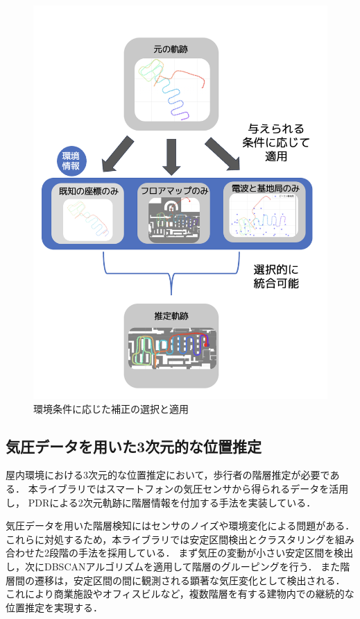 \documentclass[a4paper, 10pt, twocolumn]{jarticle}
\begin{document}
\begin{figure}[h]
    \centering
    \includegraphics[width=\linewidth]{image/integrate8.jpg}
    \caption{環境条件に応じた補正の選択と適用}
    \label{fig:corrector-class}
\end{figure}


\subsection{気圧データを用いた3次元的な位置推定}
屋内環境における3次元的な位置推定において，歩行者の階層推定が必要である．
本ライブラリではスマートフォンの気圧センサから得られるデータを活用し，
PDRによる2次元軌跡に階層情報を付加する手法を実装している．

気圧データを用いた階層検知にはセンサのノイズや環境変化による問題がある．
これらに対処するため，本ライブラリでは安定区間検出とクラスタリングを組み合わせた2段階の手法を採用している．
まず気圧の変動が小さい安定区間を検出し，次にDBSCANアルゴリズムを適用して階層のグルーピングを行う．
また階層間の遷移は，安定区間の間に観測される顕著な気圧変化として検出される．
これにより商業施設やオフィスビルなど，複数階層を有する建物内での継続的な位置推定を実現する．
\end{document}
